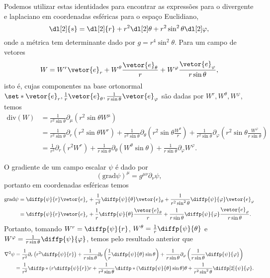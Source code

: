 Podemos utilizar estas identidades para encontrar as expressões para o divergente e laplaciano em coordenadas esféricas para o espaço Euclidiano,
\begin{equation*}
    \dl[2]{s} = \dl[2]{r} + r^2\dl[2]\theta + r^2 \sin^2\theta\dl[2]\varphi,
\end{equation*}
onde a métrica tem determinante dado por \(g = r^4 \sin^2\theta.\)
Para um campo de vetores
\begin{equation*}
    W = W^r \vetor{e}_r + W^\theta \frac{\vetor{e}_\theta}{r} + W^\varphi \frac{\vetor{e}_\varphi}{r\sin\theta},
\end{equation*}
isto é, cujas componentes na base ortonormal \(\set*{\vetor{e}_r, \frac{1}{r}\vetor{e}_\theta, \frac{1}{r\sin\theta}\vetor{e}_\varphi}\) são dadas por \(W^r, W^\theta, W^\varphi\), temos
\begin{align*}
    \mathrm{div}(W) &= \frac1{r^2 \sin\theta}\partial_\mu\left(r^2\sin\theta W^\mu\right)\\
                    &= \frac{1}{r^2\sin\theta}\partial_r\left(r^2 \sin\theta W^r\right) + \frac{1}{r^2\sin\theta}\partial_\theta\left(r^2 \sin\theta \frac{W^\theta}{r}\right) +\frac{1}{r^2\sin\theta}\partial_\varphi\left(r^2 \sin\theta \frac{W^\varphi}{r\sin\theta}\right)\\
                    &= \frac{1}{r^2}\partial_r \left(r^2 W^r\right) + \frac{1}{r \sin\theta}\partial_\theta\left(W^\theta\sin\theta \right) + \frac{1}{r\sin\theta}\partial_\varphi W^\varphi.
\end{align*}

O gradiente de um campo escalar \(\psi\) é dado por
\begin{equation*}
    (\mathrm{grad}\psi)^\mu = g^{\mu\nu}\partial_\nu \psi,
\end{equation*}
portanto em coordenadas esféricas temos
\begin{align*}
    \mathrm{grad}\psi &= \diffp{\psi}{r} \vetor{e}_r + \frac{1}{r^2} \diffp{\psi}{\theta}\vetor{e}_\theta + \frac{1}{r^2\sin^2\theta}\diffp{\psi}{\varphi} \vetor{e}_\varphi\\
                      &= \diffp{\psi}{r} \vetor{e}_r + \frac{1}{r}\diffp{\psi}{\theta} \frac{\vetor{e}_\theta}{r} + \frac{1}{r\sin\theta}\diffp{\psi}{\varphi}\frac{\vetor{e}_\varphi}{r\sin\theta}.
\end{align*}
Portanto, tomando \(W^r = \diffp{\psi}{r}\), \(W^\theta = \frac1r \diffp{\psi}{\theta}\) e \(W^\varphi = \frac1{r\sin\theta}\diffp{\psi}{\varphi}\), temos pelo resultado anterior que
\begin{align*}
    \nabla^2\psi &= \frac{1}{r^2}\partial_r \left(r^2 \diffp{\psi}{r}\right) + \frac{1}{r \sin\theta}\partial_\theta\left(\frac1r\diffp{\psi}{\theta}\sin\theta \right) + \frac{1}{r\sin\theta}\partial_\varphi\left(\frac{1}{r\sin\theta}\diffp{\psi}{\varphi}\right)\\
                 &= \frac1{r^2}\diffp*{\left(r\diffp{\psi}{r}\right)}{r} + \frac{1}{r^2\sin\theta}\diffp*{\left(\diffp{\psi}{\theta}\sin\theta\right)}{\theta} + \frac{1}{r^2\sin^2\theta}\diffp[2]{\psi}{\varphi}.
\end{align*}
